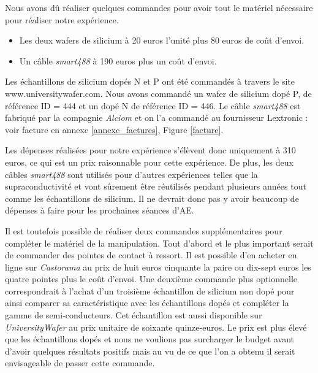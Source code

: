 Nous avons dû réaliser quelques commandes pour avoir tout le matériel nécessaire pour réaliser notre expérience.

\begin{itemize}
  \item Les deux wafers de silicium à 20 euros l'unité plus 80 euros de coût d'envoi.
  \item Un câble \emph{smart488} à 190 euros plus un coût d'envoi.
\end{itemize}
\bigskip
Les échantillons de silicium dopés N et P ont été commandés à travers le site www.universitywafer.com. Nous avons commandé un wafer de silicium dopé P, de référence ID = 444  et un dopé N de référence ID = 446. Le câble \emph{smart488} est fabriqué par la compagnie \emph{Alciom} et on l'a commandé au fournisseur Lextronic : voir facture en annexe \ref{annexe_factures}, Figure \ref{facture}.

Les dépenses réalisées pour notre expérience s'élèvent donc uniquement à 310 euros, ce qui est un prix raisonnable pour cette expérience. De plus, les deux câbles \emph{smart488} sont utilisés pour d'autres expériences telles que la supraconductivité et vont sûrement être réutilisés pendant plusieurs années tout comme les échantillons de silicium. Il ne devrait donc pas y avoir beaucoup de dépenses à faire pour les prochaines séances d'AE.

Il est toutefois possible de réaliser deux commandes supplémentaires pour compléter le matériel de la manipulation.
Tout d'abord et le plus important serait de commander des pointes de contact à ressort. Il est possible d'en acheter en ligne sur \emph{Castorama} au prix de huit euros cinquante la paire ou dix-sept euros les quatre pointes plus le coût d'envoi.
Une deuxième commande plus optionnelle correspondrait à l'achat d'un troisième échantillon de silicium non dopé pour ainsi comparer sa caractéristique avec les échantillons dopés et compléter la gamme de semi-conducteurs. Cet échantillon est aussi disponible sur \emph{UniversityWafer} au prix unitaire de soixante quinze-euros. Le prix est plus élevé que les échantillons dopés et nous ne voulions pas surcharger le budget avant d'avoir quelques résultats positifs mais au vu de ce que l'on a obtenu il serait envisageable de passer cette commande.
